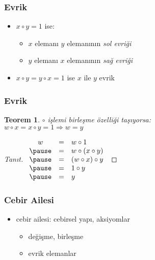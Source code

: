 \documentclass[dvipsnames]{beamer}
\theoremstyle{definition}
\theoremstyle{example}
\theoremstyle{plain}
\newtheorem{teorem}[theorem]{Teorem}
\begin{document}
\begin{frame}
  \frametitle{Evrik}

  \begin{itemize}
    \item $x \circ y = 1$ ise:
    \begin{itemize}
      \item $x$ elemanı $y$ elemanının \emph{sol evriği}
      \item $y$ elemanı $x$ elemanının \emph{sağ evriği}
    \end{itemize}

    \medskip
    \item $x \circ y = y \circ x = 1$ ise
      $x$ ile $y$ \alert{evrik}
  \end{itemize}
\end{frame}

\begin{frame}
  \frametitle{Evrik}

  \begin{teorem}
    $\circ$ işlemi birleşme özelliği taşıyorsa:\\
    $w \circ x = x \circ y = 1 \Rightarrow w = y$
  \end{teorem}

  \pause
  \begin{proof}[Tanıt]
    $\begin{array}{ccl}
      w & = & w \circ 1\\ \pause
        & = & w \circ (x \circ y)\\ \pause
        & = & (w \circ x) \circ y\\ \pause
        & = & 1 \circ y\\ \pause
        & = & y
    \end{array}$
  \end{proof}
\end{frame}

\begin{frame}
  \frametitle{Cebir Ailesi}

  \begin{itemize}
    \item \alert{cebir ailesi}: cebirsel yapı, aksiyomlar
    \begin{itemize}
      \item değişme, birleşme
      \item evrik elemanlar
    \end{itemize}
  \end{itemize}
\end{frame}
\end{document}

